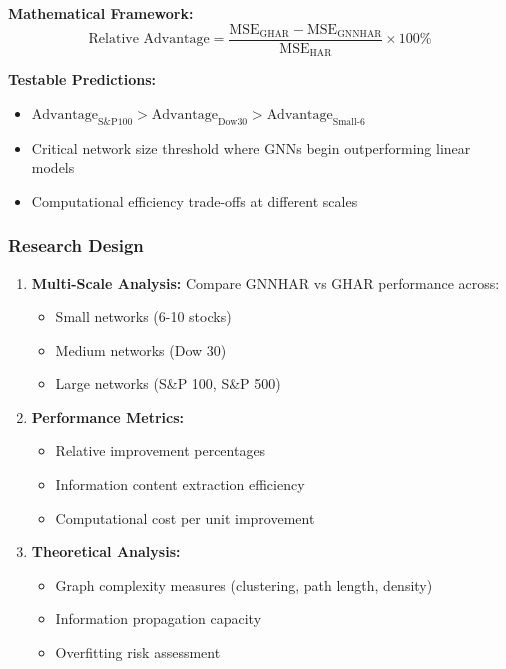 \documentclass[12pt,a4paper]{article}
\begin{document}
\textbf{Mathematical Framework:}
$$\text{Relative Advantage} = \frac{\text{MSE}_{\text{GHAR}} - \text{MSE}_{\text{GNNHAR}}}{\text{MSE}_{\text{HAR}}} \times 100\%$$

\textbf{Testable Predictions:}
\begin{itemize}
\item $\text{Advantage}_{\text{S\&P100}} > \text{Advantage}_{\text{Dow30}} > \text{Advantage}_{\text{Small-6}}$
\item Critical network size threshold where GNNs begin outperforming linear models
\item Computational efficiency trade-offs at different scales
\end{itemize}

\subsubsection{Research Design}

\begin{enumerate}
\item \textbf{Multi-Scale Analysis:} Compare GNNHAR vs GHAR performance across:
   \begin{itemize}
   \item Small networks (6-10 stocks)
   \item Medium networks (Dow 30)
   \item Large networks (S\&P 100, S\&P 500)
   \end{itemize}

\item \textbf{Performance Metrics:}
   \begin{itemize}
   \item Relative improvement percentages
   \item Information content extraction efficiency
   \item Computational cost per unit improvement
   \end{itemize}

\item \textbf{Theoretical Analysis:}
   \begin{itemize}
   \item Graph complexity measures (clustering, path length, density)
   \item Information propagation capacity
   \item Overfitting risk assessment
   \end{itemize}
\end{enumerate}
\end{document}
